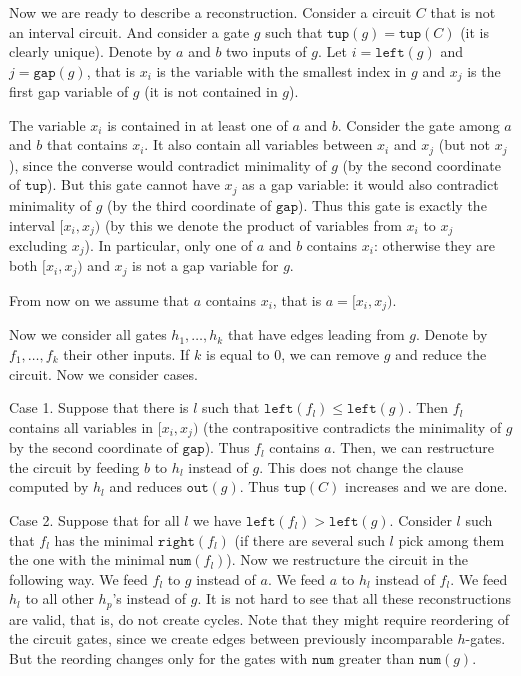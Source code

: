 \documentclass[11pt,letterpaper]{article}
\newcommand{\lef}{\texttt{left}}
\newcommand{\righ}{\texttt{right}}
\newcommand{\gap}{\texttt{gap}}
\newcommand{\num}{\texttt{num}}
\newcommand{\out}{\texttt{out}}
\newcommand{\tup}{\texttt{tup}}
\begin{document}
Now we are ready to describe a reconstruction. Consider a circuit $C$ that is not an interval circuit. And consider a gate $g$ such that $\tup(g)=\tup(C)$ (it is clearly unique). Denote by $a$ and $b$ two inputs of $g$. Let $i=\lef(g)$ and $j=\gap(g)$, that is $x_i$ is the variable with the smallest index in $g$ and $x_j$ is the first gap variable of $g$ (it is not contained in $g$).

The variable $x_i$ is contained in at least one of $a$ and $b$. Consider the gate among $a$ and $b$ that contains $x_i$. It also contain all variables between $x_i$ and $x_j$ (but not $x_j$), since the converse would contradict minimality of $g$ (by the second coordinate of $\tup$). But this gate cannot have $x_j$ as a gap variable: it would also contradict minimality of $g$ (by the third coordinate of $\gap$). Thus this gate is exactly the interval $[x_i,x_j)$ (by this we denote the product of variables from $x_i$ to $x_j$ excluding $x_j$). In particular, only one of $a$ and $b$ contains $x_i$: otherwise they are both $[x_i,x_j)$ and $x_j$ is not a gap variable for $g$.

From now on we assume that $a$ contains $x_i$, that is $a=[x_i,x_j)$.

Now we consider all gates $h_1,\ldots, h_k$ that have edges leading from $g$. Denote by $f_1,\ldots, f_k$ their other inputs. If $k$ is equal to $0$, we can remove $g$ and reduce the circuit. Now we consider cases.

Case 1. Suppose that there is $l$ such that $\lef(f_l) \leq \lef(g)$. Then $f_l$ contains all variables in $[x_i,x_j)$ (the contrapositive contradicts the minimality of $g$ by the second coordinate of $\gap$). Thus $f_l$ contains $a$. Then, we can restructure the circuit by feeding $b$ to $h_l$ instead of $g$. This does not change the clause computed by $h_l$ and reduces $\out(g)$. Thus $\tup(C)$ increases and we are done.

Case 2. Suppose that for all $l$ we have $\lef(f_l)>\lef(g)$. Consider $l$ such that $f_l$ has the minimal $\righ(f_l)$ (if there are several such $l$ pick among them the one with the minimal $\num(f_l)$). Now we restructure the circuit in the following way. We feed $f_l$ to $g$ instead of $a$. We feed $a$ to $h_l$ instead of $f_l$. We feed $h_l$ to all other $h_p$'s instead of $g$. It is not hard to see that all these reconstructions are valid, that is, do not create cycles. Note that they might require reordering of the circuit gates, since we create edges between previously incomparable $h$-gates. But the reording changes only for the gates with $\num$ greater than $\num(g)$.
\end{document}
